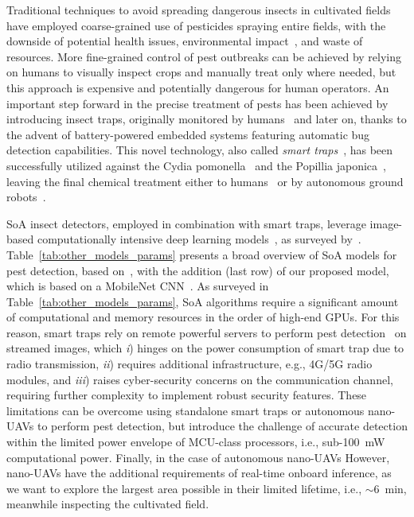 Traditional techniques to avoid spreading dangerous insects in cultivated fields have employed coarse-grained use of pesticides spraying entire fields, with the downside of potential health issues, environmental impact~\cite{DLEntomology}, and waste of resources.
More fine-grained control of pest outbreaks can be achieved by relying on humans to visually inspect crops and manually treat only where needed, but this approach is expensive and potentially dangerous for human operators.
An important step forward in the precise treatment of pests has been achieved by introducing insect traps, originally monitored by humans~\cite{preti2021insect} and later on, thanks to the advent of battery-powered embedded systems featuring automatic bug detection capabilities.
This novel technology, also called \textit{smart traps}~\cite{SmartTrap}, has been successfully utilized against the Cydia pomonella~\cite{JU2021104925} and the Popillia japonica~\cite{EPPO}, leaving the final chemical treatment either to humans~\cite{preti2021insect} or by autonomous ground robots~\cite{tahmasebi2022autonomous}.

SoA insect detectors, employed in combination with smart traps, leverage image-based computationally intensive deep learning models~\cite{FasterRCNNInsect2, RetinaNetInsect1, RetinaNetInsect1, RFCNInsect1}, as surveyed by~\cite{PestDetectionSurvey}.
Table~\ref{tab:other_models_params} presents a broad overview of SoA models for pest detection, based on~\citet{9601235}, with the addition (last row) of our proposed model, which is based on a MobileNet CNN~\citep{sandler2018mobilenetv2, howard2019searching}.
As surveyed in Table~\ref{tab:other_models_params}, SoA algorithms require a significant amount of computational and memory resources in the order of high-end GPUs.
For this reason, smart traps rely on remote powerful servers to perform pest detection~\cite{agriculture12101745} on streamed images, which \textit{i}) hinges on the power consumption of smart trap due to radio transmission, \textit{ii}) requires additional infrastructure, e.g., 4G/5G radio modules, and \textit{iii}) raises cyber-security concerns on the communication channel, requiring further complexity to implement robust security features. 
These limitations can be overcome using standalone smart traps or autonomous nano-UAVs to perform pest detection, but introduce the challenge of accurate detection within the limited power envelope of MCU-class processors, i.e., sub-\SI{100}{\milli\watt} computational power.
Finally, in the case of autonomous nano-UAVs
However, nano-UAVs have the additional requirements of real-time onboard inference, as we want to explore the largest area possible in their limited lifetime, i.e., $\sim$\SI{6}{\minute}, meanwhile inspecting the cultivated field.

